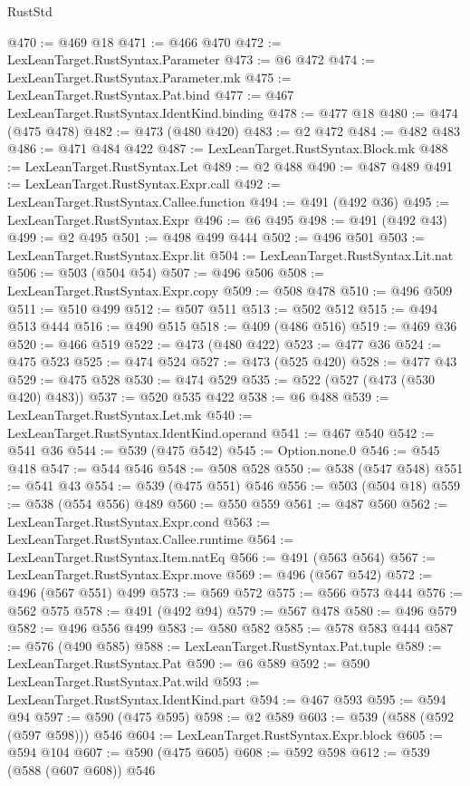 \begin{lexlean}{RustStd}
\begin{coremodule}
@470 := @469 @18
@471 := @466 @470
@472 := LexLeanTarget.RustSyntax.Parameter
@473 := @6 @472
@474 := LexLeanTarget.RustSyntax.Parameter.mk
@475 := LexLeanTarget.RustSyntax.Pat.bind
@477 := @467 LexLeanTarget.RustSyntax.IdentKind.binding
@478 := @477 @18
@480 := @474 (@475 @478)
@482 := @473 (@480 @420)
@483 := @2 @472
@484 := @482 @483
@486 := @471 @484 @422
@487 := LexLeanTarget.RustSyntax.Block.mk
@488 := LexLeanTarget.RustSyntax.Let
@489 := @2 @488
@490 := @487 @489
@491 := LexLeanTarget.RustSyntax.Expr.call
@492 := LexLeanTarget.RustSyntax.Callee.function
@494 := @491 (@492 @36)
@495 := LexLeanTarget.RustSyntax.Expr
@496 := @6 @495
@498 := @491 (@492 @43)
@499 := @2 @495
@501 := @498 @499 @444
@502 := @496 @501
@503 := LexLeanTarget.RustSyntax.Expr.lit
@504 := LexLeanTarget.RustSyntax.Lit.nat
@506 := @503 (@504 @54)
@507 := @496 @506
@508 := LexLeanTarget.RustSyntax.Expr.copy
@509 := @508 @478
@510 := @496 @509
@511 := @510 @499
@512 := @507 @511
@513 := @502 @512
@515 := @494 @513 @444
@516 := @490 @515
@518 := @409 (@486 @516)
@519 := @469 @36
@520 := @466 @519
@522 := @473 (@480 @422)
@523 := @477 @36
@524 := @475 @523
@525 := @474 @524
@527 := @473 (@525 @420)
@528 := @477 @43
@529 := @475 @528
@530 := @474 @529
@535 := @522 (@527 (@473 (@530 @420) @483))
@537 := @520 @535 @422
@538 := @6 @488
@539 := LexLeanTarget.RustSyntax.Let.mk
@540 := LexLeanTarget.RustSyntax.IdentKind.operand
@541 := @467 @540
@542 := @541 @36
@544 := @539 (@475 @542)
@545 := Option.none.{0}
@546 := @545 @418
@547 := @544 @546
@548 := @508 @528
@550 := @538 (@547 @548)
@551 := @541 @43
@554 := @539 (@475 @551) @546
@556 := @503 (@504 @18)
@559 := @538 (@554 @556) @489
@560 := @550 @559
@561 := @487 @560
@562 := LexLeanTarget.RustSyntax.Expr.cond
@563 := LexLeanTarget.RustSyntax.Callee.runtime
@564 := LexLeanTarget.RustSyntax.Item.natEq
@566 := @491 (@563 @564)
@567 := LexLeanTarget.RustSyntax.Expr.move
@569 := @496 (@567 @542)
@572 := @496 (@567 @551) @499
@573 := @569 @572
@575 := @566 @573 @444
@576 := @562 @575
@578 := @491 (@492 @94)
@579 := @567 @478
@580 := @496 @579
@582 := @496 @556 @499
@583 := @580 @582
@585 := @578 @583 @444
@587 := @576 (@490 @585)
@588 := LexLeanTarget.RustSyntax.Pat.tuple
@589 := LexLeanTarget.RustSyntax.Pat
@590 := @6 @589
@592 := @590 LexLeanTarget.RustSyntax.Pat.wild
@593 := LexLeanTarget.RustSyntax.IdentKind.part
@594 := @467 @593
@595 := @594 @94
@597 := @590 (@475 @595)
@598 := @2 @589
@603 := @539 (@588 (@592 (@597 @598))) @546
@604 := LexLeanTarget.RustSyntax.Expr.block
@605 := @594 @104
@607 := @590 (@475 @605)
@608 := @592 @598
@612 := @539 (@588 (@607 @608)) @546

\end{coremodule}
\end{lexlean}
